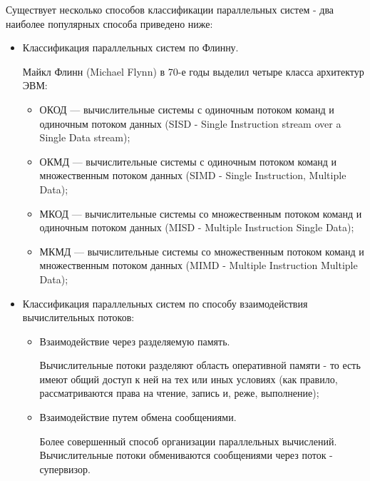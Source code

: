 Существует несколько способов классификации параллельных систем - два наиболее популярных способа приведено ниже:

\begin{itemize}

	\item Классификация параллельных систем по Флинну.

	Майкл Флинн (Michael Flynn) в 70-е годы выделил четыре класса архитектур ЭВМ:

	\begin{itemize}
	
		\item ОКОД — вычислительные системы с одиночным потоком команд и одиночным потоком данных (SISD - Single Instruction stream over a Single Data stream);
		\item ОКМД — вычислительные системы с одиночным потоком команд и множественным потоком данных (SIMD - Single Instruction, Multiple Data);
		\item МКОД — вычислительные системы со множественным потоком команд и одиночным потоком данных (MISD - Multiple Instruction Single Data);
		\item МКМД — вычислительные системы со множественным потоком команд и множественным потоком данных (MIMD - Multiple Instruction Multiple Data);

	\end{itemize}

	\item Классификация параллельных систем по способу взаимодействия вычислительных потоков:

	\begin{itemize}

		\item Взаимодействие через разделяемую память.

			Вычислительные потоки разделяют область оперативной памяти - то есть имеют общий доступ к ней на тех или иных условиях (как правило, рассматриваются права на чтение, запись и, реже, выполнение);

		\item Взаимодействие путем обмена сообщениями.

			Более совершенный способ организации параллельных вычислений. Вычислительные потоки обмениваются сообщениями через поток - супервизор.

	\end{itemize}

\end{itemize}

